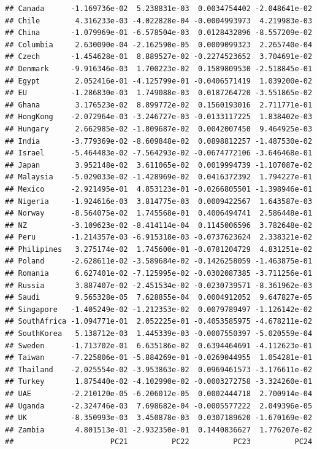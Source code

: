 \documentclass[11pt,preprint, authoryear]{elsarticle}
\numberwithin{equation}{section}
\numberwithin{figure}{section}
\numberwithin{table}{section}
\begin{document}
\begin{verbatim}
## Canada      -1.169736e-02  5.238831e-03  0.0034754402 -2.048641e-02
## Chile        4.316233e-03 -4.022828e-04 -0.0004993973  4.219983e-03
## China       -1.079969e-01 -6.578504e-03  0.0128432896 -8.557209e-02
## Columbia     2.630090e-04 -2.162590e-05  0.0009099323  2.265740e-04
## Czech       -1.454628e-01  8.889527e-02 -0.2274523652  3.704691e-02
## Denmark     -9.916346e-03  1.700223e-02  0.1589809530 -2.518845e-01
## Egypt        2.052416e-01 -4.125799e-01 -0.0406571419  1.039200e-02
## EU          -1.286830e-03  1.749088e-03  0.0187264720 -3.551865e-02
## Ghana        3.176523e-02  8.899772e-02  0.1560193016  2.711771e-01
## HongKong    -2.072964e-03 -3.246727e-03 -0.0133117225  1.838402e-03
## Hungary      2.662985e-02 -1.809687e-02  0.0042007450  9.464925e-03
## India       -3.779369e-02 -8.609848e-02  0.0898812257 -1.487530e-02
## Israel      -5.464483e-02 -7.564293e-02 -0.0674772106 -3.646468e-01
## Japan        3.952148e-02  3.611065e-02  0.0019994739 -1.107087e-02
## Malaysia    -5.029033e-02 -1.428969e-02  0.0416372392  1.794227e-01
## Mexico      -2.921495e-01  4.853123e-01 -0.0266805501 -1.398946e-01
## Nigeria     -1.924616e-03  3.814775e-03  0.0009422567  1.643587e-03
## Norway      -8.564075e-02  1.745568e-01  0.4006494741  2.586448e-01
## NZ          -3.109623e-02 -8.414114e-04  0.1145006596  3.782648e-02
## Peru        -1.214357e-03 -6.915318e-03 -0.0737623624  2.338321e-02
## Philipines   3.275174e-02  1.745600e-01 -0.0781204729  4.831251e-02
## Poland      -2.628611e-02 -3.589684e-02 -0.1426258059 -1.463875e-01
## Romania      6.627401e-02 -7.125995e-02 -0.0302087385 -3.711256e-01
## Russia       3.887407e-02 -2.451534e-02 -0.0230739571 -8.361962e-03
## Saudi        9.565328e-05  7.628855e-04  0.0004912052  9.647827e-05
## Singapore   -1.405249e-02 -1.212353e-02  0.0079789497 -1.126142e-02
## SouthAfrica -1.094771e-01  2.052225e-01 -0.4053585975 -4.678211e-02
## SouthKorea   5.138712e-03  1.445339e-03 -0.0007550397 -5.020559e-04
## Sweden      -1.713702e-01  6.635186e-02  0.6394464691 -4.112623e-01
## Taiwan      -7.225806e-01 -5.884269e-01 -0.0269044955  1.054281e-01
## Thailand    -2.025554e-02 -3.953863e-02  0.0969461573 -3.176611e-02
## Turkey       1.875440e-02 -4.102990e-02 -0.0003272758 -3.324260e-01
## UAE         -2.210120e-05 -6.206012e-05  0.0002444718  2.700914e-04
## Uganda      -2.324746e-03  7.698682e-04 -0.0005577222  2.049396e-05
## UK          -8.350993e-03  3.450878e-03  0.0307189620 -1.670169e-02
## Zambia       4.801513e-01 -2.932350e-01  0.1440836627  1.776207e-02
##                      PC21          PC22          PC23          PC24

\end{verbatim}
\end{document}
